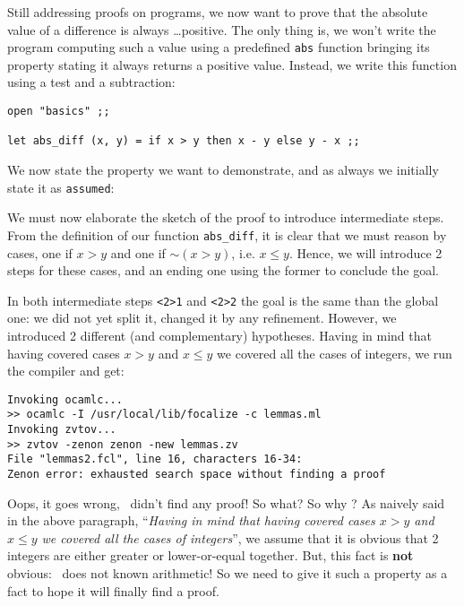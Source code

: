 \documentclass[11pt,a4paper,twoside,onecolumn,fullpage]{article}
\begin{document}
\medskip
Still addressing proofs on programs, we now want to prove that the
absolute value of a difference is always \ldots positive. The only
thing is, we won't write the program computing such a value using a
predefined {\tt abs} function bringing its property stating it always
returns a positive value. Instead, we write this function using a test
and a subtraction:

{\scriptsize
\begin{lstlisting}[caption=lemmas.fcl]
open "basics" ;;

let abs_diff (x, y) = if x > y then x - y else y - x ;;
\end{lstlisting}}

We now state the property we want to demonstrate, and as always we initially
state it as \lstinline{assumed}:

{\scriptsize
}

We must now elaborate the sketch of the proof to introduce
intermediate steps. From the definition of our function
\lstinline"abs_diff", it is clear that we must reason by cases, one if
$x > y$ and one if $\sim (x > y)$, i.e. $x \le y$. Hence, we will
introduce 2 steps for these cases, and an ending one using the former
to conclude the goal.

{\scriptsize
}

In both intermediate steps \lstinline"<2>1" and \lstinline"<2>2" the
goal is the same than the global one: we did not yet split it, changed
it by any refinement. However, we introduced 2 different (and
complementary) hypotheses.
Having in mind that having covered cases $x > y$
and  $x \le y$ we covered all the cases of integers, we run the
compiler and get:

{\scriptsize
\begin{verbatim}
Invoking ocamlc...
>> ocamlc -I /usr/local/lib/focalize -c lemmas.ml
Invoking zvtov...
>> zvtov -zenon zenon -new lemmas.zv
File "lemmas2.fcl", line 16, characters 16-34:
Zenon error: exhausted search space without finding a proof
\end{verbatim}}

Oops, it goes wrong, \zenon\ didn't find any proof! So what? So why ?
As naively said in the above paragraph, ``{\em Having in mind that having
covered cases $x > y$ and  $x \le y$ we covered all the cases of
integers}'', we assume that it is obvious that 2 integers are either
greater or lower-or-equal together. But, this fact is {\bf not}
obvious: \zenon\ does not known arithmetic! So we need to give it
such a property as a fact to hope it will finally find a proof.
\end{document}

